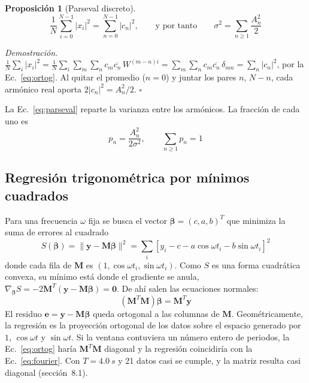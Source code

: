 \documentclass[11pt,letterpaper]{article}
\newtheorem{prop}{Proposición}
\begin{document}
\begin{prop}[Parseval discreto]
\begin{equation}
\frac{1}{N}\sum_{i=0}^{N-1} |x_i|^2 = \sum_{n=0}^{N-1}|c_n|^2, \qquad\text{y por tanto}\qquad \sigma^2 = \sum_{n\geq1}\frac{A_n^2}{2}
\label{eq:parseval}
\end{equation}
\end{prop}
\textit{Demostración.} $\frac{1}{N}\sum_i |x_i|^2 = \frac1N\sum_i\sum_m\sum_n c_m\overline{c_n}\,W^{(m-n)i} = \sum_m\sum_n c_m\overline{c_n}\,\delta_{mn} = \sum_n |c_n|^2$, por la Ec.~\eqref{eq:ortog}. Al quitar el promedio ($n = 0$) y juntar los pares $n$, $N-n$, cada armónico real aporta $2|c_n|^2 = A_n^2/2$. $\square$

La Ec.~\eqref{eq:parseval} reparte la varianza entre los armónicos. La fracción de cada uno es
\begin{equation}
p_n = \frac{A_n^2}{2\sigma^2}, \qquad \sum_{n\geq1} p_n = 1
\label{eq:pn}
\end{equation}

\subsection{Regresión trigonométrica por mínimos cuadrados}
Para una frecuencia $\omega$ fija se busca el vector $\boldsymbol\beta = (c, a, b)^T$ que minimiza la suma de errores al cuadrado
\begin{equation}
S(\boldsymbol\beta) = \|\mathbf y - \mathbf M\boldsymbol\beta\|^2 = \sum_i\left[y_i - c - a\cos\omega t_i - b\sin\omega t_i\right]^2
\label{eq:S}
\end{equation}
donde cada fila de $\mathbf M$ es $(1, \cos\omega t_i, \sin\omega t_i)$. Como $S$ es una forma cuadrática convexa, su mínimo está donde el gradiente se anula, $\nabla_{\boldsymbol\beta} S = -2\mathbf M^T(\mathbf y - \mathbf M\boldsymbol\beta) = \mathbf 0$. De ahí salen las ecuaciones normales:
\begin{equation}
\left(\mathbf M^T\mathbf M\right)\boldsymbol\beta = \mathbf M^T\mathbf y
\label{eq:normal}
\end{equation}
El residuo $\mathbf e = \mathbf y - \mathbf M\boldsymbol\beta$ queda ortogonal a las columnas de $\mathbf M$. Geométricamente, la regresión es la proyección ortogonal de los datos sobre el espacio generado por $1$, $\cos\omega t$ y $\sin\omega t$. Si la ventana contuviera un número entero de periodos, la Ec.~\eqref{eq:ortog} haría $\mathbf M^T\mathbf M$ diagonal y la regresión coincidiría con la Ec.~\eqref{eq:fourier}. Con $T = \SI{4.0}{s}$ y 21 datos casi se cumple, y la matriz resulta casi diagonal (sección~8.1).
\end{document}
